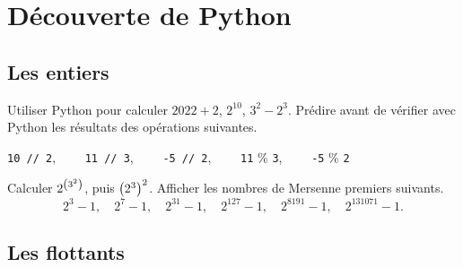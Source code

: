 \documentclass{magnolia}
\begin{document}

\section{Découverte de Python}


\subsection{Les entiers}

\begin{questions}
\question Utiliser Python pour calculer $2022 + 2$, $2^{10}$, $3^2-2^3$.
\question Prédire avant de vérifier avec Python les résultats des opérations suivantes.
  \begin{center}
  \verb_10 // 2_, $\qquad$\verb_11 // 3_, $\qquad$\verb_-5 // 2_, $\qquad$\verb_11_ \% \verb_3_, $\qquad$\verb_-5_ \% \verb_2_
  \end{center}
\question Calculer $2^{\left(3^2\right)}$, puis $\left(2^3\right)^2$.
\question Afficher les nombres de Mersenne premiers suivants.
  \[2^3-1,\quad 2^7-1,\quad 2^{31}-1,\quad 2^{127}-1,\quad 2^{8191}-1,\quad 2^{131071}-1.\]
\end{questions}
%

\subsection{Les flottants}
\end{document}
